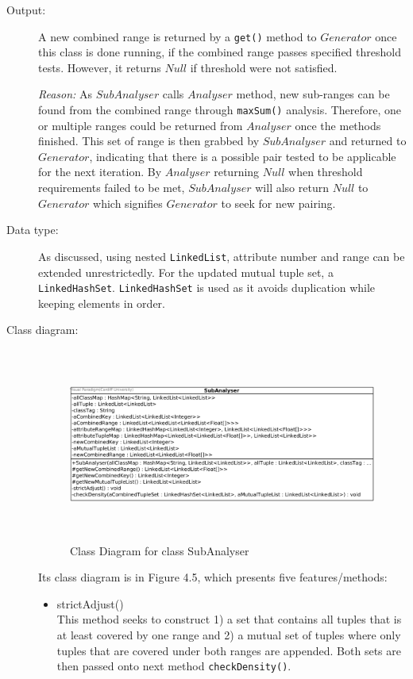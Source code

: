 \begin{description}
\item[Output: ] A new combined range is returned by a \texttt{get()} method to $Generator$ once this class is done running, if the combined range passes specified threshold tests. However, it returns $Null$ if threshold were not satisfied.
  
\textit{Reason: } As $SubAnalyser$ calls $Analyser$ method, new sub-ranges can be found from the combined range through \texttt{maxSum()} analysis. Therefore, one or multiple ranges could be returned from $Analyser$ once the methods finished. This set of range is then grabbed by $SubAnalyser$ and returned to $Generator$, indicating that there is a possible pair tested to be applicable for the next iteration. By $Analyser$ returning $Null$ when threshold requirements failed to be met, $SubAnalyser$ will also return $Null$ to $Generator$ which signifies $Generator$ to seek for new pairing.

\item[Data type: ] As discussed, using nested \texttt{LinkedList}, attribute number and range can be extended unrestrictedly. For the updated mutual tuple set, a \texttt{LinkedHashSet}. \texttt{LinkedHashSet} is used as it avoids duplication while keeping elements in order. 

\item[Class diagram: ] 

\begin{figure}[h]
    \centering
    \includegraphics[width=4in, height=2.5in]{figures/class_subanalyser}
    \caption[Class Diagram for class SubAnalyser]{Class Diagram for class SubAnalyser}
    \label{fig:figure4_5}
\end{figure}

Its class diagram is in Figure 4.5, which presents five features/methods:

\begin{itemize}
	\item{strictAdjust()} \\
 	This method seeks to construct 1) a set that contains all tuples that is at least covered by one range and 2) a mutual set of tuples where only tuples that are covered under both ranges are appended. Both sets are then passed onto next method \texttt{checkDensity()}.
	

\end{itemize}
\end{description}
